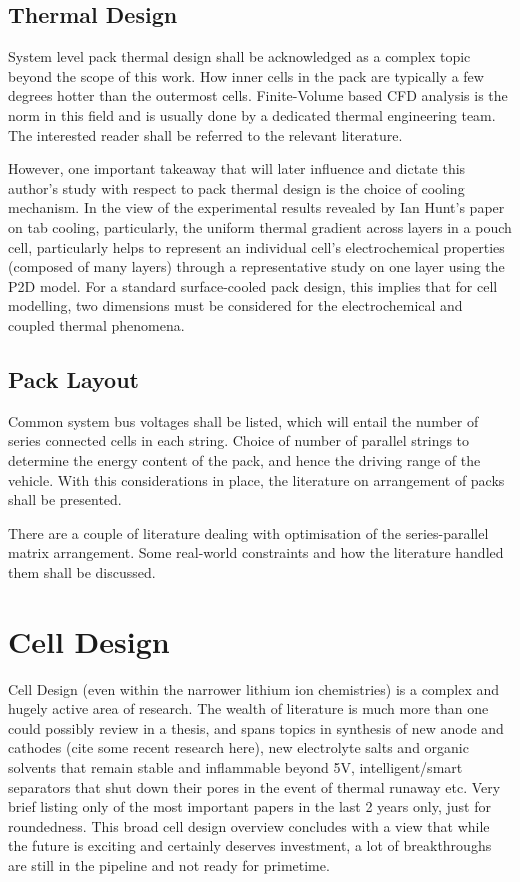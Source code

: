 \subsection{Thermal Design}

System level pack thermal design shall be acknowledged as a complex topic beyond
the scope of this work. How inner cells  in the pack are typically a few degrees
hotter than the outermost cells. Finite-Volume based CFD analysis is the norm in
this field  and is  usually done  by a dedicated  thermal engineering  team. The
interested reader shall be referred to the relevant literature.

However,  one important  takeaway that  will  later influence  and dictate  this
author's study  with respect  to pack  thermal design is  the choice  of cooling
mechanism. In the view of the  experimental results revealed by Ian Hunt's paper
on tab  cooling, particularly, the uniform  thermal gradient across layers  in a
pouch cell, particularly helps to represent an individual cell's electrochemical
properties  (composed of  many layers)  through  a representative  study on  one
layer  using the  P2D model.  For a  standard surface-cooled  pack design,  this
implies  that for  cell modelling,  two dimensions  must be  considered for  the
electrochemical and coupled thermal phenomena.

\subsection{Pack Layout}
Common system  bus voltages  shall be  listed, which will  entail the  number of
series connected cells  in each string. Choice of number  of parallel strings to
determine the  energy content of  the pack, and hence  the driving range  of the
vehicle. With  this considerations  in place, the  literature on  arrangement of
packs shall be presented.

There   are  a   couple  of   literature  dealing   with  optimisation   of  the
series-parallel  matrix arrangement.  Some  real-world constraints  and how  the
literature handled them shall be discussed.

\section{Cell Design}

Cell Design (even within the narrower  lithium ion chemistries) is a complex and
hugely active area of  research. The wealth of literature is  much more than one
could possibly review  in a thesis, and  spans topics in synthesis  of new anode
and cathodes (cite some recent research here), new electrolyte salts and organic
solvents  that  remain  stable  and  inflammable  beyond  5V,  intelligent/smart
separators that shut down their pores in  the event of thermal runaway etc. Very
brief listing only of  the most important papers in the last  2 years only, just
for roundedness.  This broad  cell design  overview concludes  with a  view that
while  the future  is  exciting  and certainly  deserves  investment,  a lot  of
breakthroughs are still in the pipeline and not ready for primetime.


